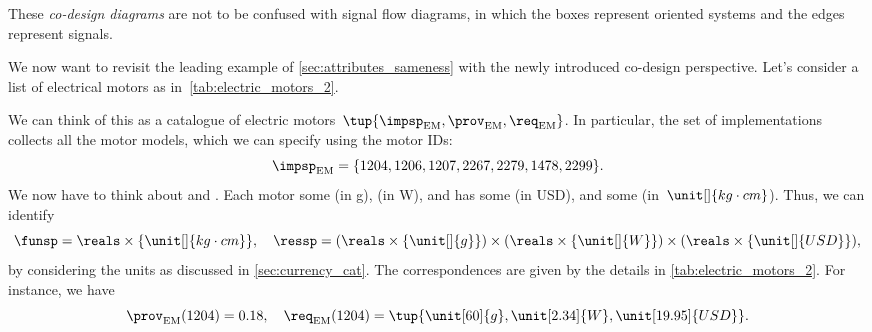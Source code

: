 These \emph{co-design diagrams} are not to be confused with signal flow diagrams, in which the boxes represent oriented systems and the edges represent signals.


\begin{example}
  \label{exa:dpi_elmotor}
  We now want to revisit the leading example of \cref{sec:attributes_sameness} with the newly introduced co-design perspective. Let's consider a list of electrical motors as in~\cref{tab:electric_motors_2}.
  \begin{table*}[h]
    \centering
    \caption{A simplified catalogue of motors.}
    \label{tab:electric_motors_2}
  \end{table*}

  We can think of this as a catalogue of electric motors~$\tup{\impsp_\mathrm{EM},\prov_\mathrm{EM},\req_\mathrm{EM}}$.
  In particular, the set of implementations collects all the motor models, which we can specify using the motor IDs:
  \begin{equation}
    \impsp_\mathrm{EM}=\{1204,1206,1207,2267,2279,1478,2299 \}.
  \end{equation}
  We now have to think about  and .
  Each motor  some  (in \unit[]{g}),  (in \unit[]{W}), and has some  (in USD), and  some  (in~$\unit[]{kg\cdot cm}$).
  Thus, we can identify
  \begin{equation*}
    \funsp =\reals\times \{\unit[]{kg\cdot cm}\},\quad \ressp=(\reals\times \{\unit[]{g}\})\times (\reals\times \{\unit[]{W}\})\times (\reals\times \{\unit[]{USD}\}),
  \end{equation*}
  by considering the units as discussed in \cref{sec:currency_cat}.
  The correspondences are given by the details in \cref{tab:electric_motors_2}.
  For instance, we have
  \begin{equation}
    \prov_\mathrm{EM}(1204)=0.18, \quad \req_\mathrm{EM}(1204)=\tup{\unit[60]{g},\unit[2.34]{W},\unit[19.95]{USD}}.
  \end{equation}


\end{example}
